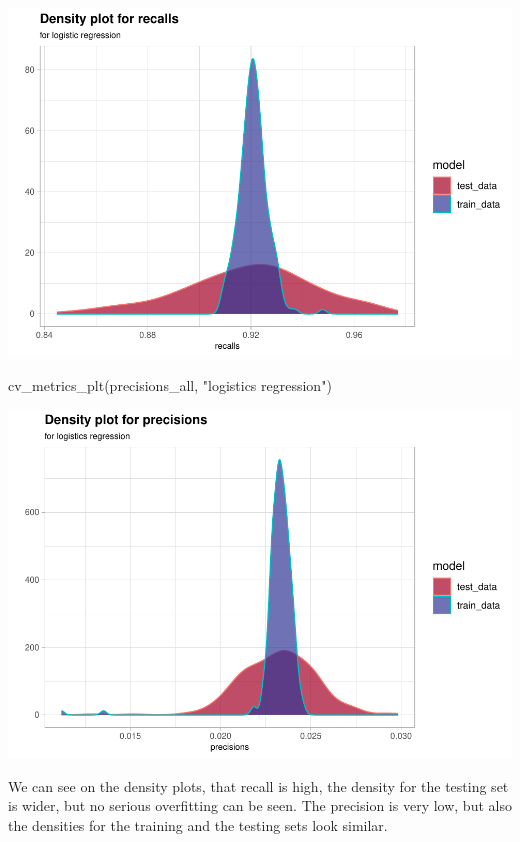 \documentclass[
]{report}
\newenvironment{Shaded}{\begin{snugshade}}{\end{snugshade}}
\newcommand{\FunctionTok}[1]{\textcolor[rgb]{0.00,0.00,0.00}{#1}}
\newcommand{\NormalTok}[1]{#1}
\newcommand{\StringTok}[1]{\textcolor[rgb]{0.31,0.60,0.02}{#1}}
\begin{document}
\includegraphics{credit_card_fraud_detection_files/figure-latex/cv_logreg-1.pdf}

\begin{Shaded}
\begin{Highlighting}[]
\FunctionTok{cv\_metrics\_plt}\NormalTok{(precisions\_all, }\StringTok{"logistics regression"}\NormalTok{)}
\end{Highlighting}
\end{Shaded}

\includegraphics{credit_card_fraud_detection_files/figure-latex/cv_logreg-2.pdf}

We can see on the density plots, that recall is high, the density for
the testing set is wider, but no serious overfitting can be seen. The
precision is very low, but also the densities for the training and the
testing sets look similar.
\end{document}
